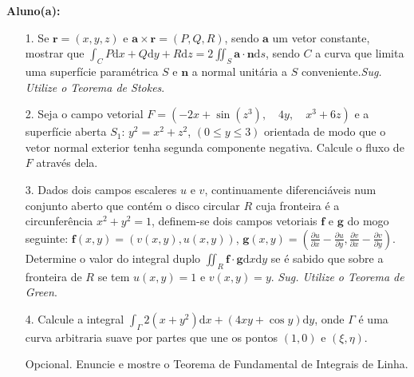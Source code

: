 \documentclass[oneside,a4paper,12pt]{article}
\begin{document}
     \begin{flushleft}
     	\textbf{Aluno(a):}
     \end{flushleft}
 
 \begin{itemize}
 	\item[1.] Se $\textbf{r}=(x,y,z)$ e $\textbf{a}\times \textbf{r}=(P,Q,R)$, sendo $\textbf{a}$ um vetor constante, mostrar que $\int_{C} P\mathrm{d}x+Q\mathrm{d}y+R\mathrm{d}z=2\iint_{S}\textbf{a}\cdot \textbf{n}\mathrm{d}s$, sendo $C$ a curva que limita uma superfície paramétrica $S$ e $\textbf{n}$ a normal unitária a $S$ conveniente.\textit{Sug. Utilize o Teorema de Stokes}.
 \end{itemize} 
 \begin{itemize}
 	\item[2.] Seja o campo vetorial $F=(-2x+\sin(z^{3}),\quad 4y,\quad x^{3}+6z)$ e a superfície aberta $S_{1}$: $y^{2}=x^{2}+z^{2}$, $(0\leq y \leq 3)$ orientada de modo que o vetor normal exterior tenha segunda componente negativa. Calcule o fluxo de $F$ através dela. 
 \end{itemize}
 \begin{itemize}
 	\item [3.] Dados dois campos escaleres $u$ e $v$, continuamente diferenciáveis num conjunto aberto que contém o disco circular $R$ cuja fronteira é a circunferência $x^{2}+y^{2}=1$, definem-se dois campos vetoriais $\textbf{f}$ e $\textbf{g}$ do mogo seguinte: $\textbf{f}(x,y)=(v(x,y), u(x,y))$, $\textbf{g}(x,y)=(\frac{\partial u}{\partial x}-\frac{\partial u}{\partial y}, \frac{\partial v}{\partial x}-\frac{\partial v}{\partial y})$. Determine o valor do integral duplo $\iint_{R} \textbf{f}\cdot\textbf{g}\mathrm{d}x\mathrm{d}y$ se é sabido que sobre a fronteira de $R$ se tem $u(x,y)=1$ e $v(x,y)=y$. \textit{Sug. Utilize o Teorema de Green}.
 \end{itemize}
 \begin{itemize}
 	\item[4.]Calcule a integral $\int_{\Gamma}2(x+y^{2}) \mathrm{d}x+(4xy+\cos y)\mathrm{d}y$, onde $\Gamma$ é uma curva arbitraria suave por partes que une os pontos $(1,0)$ e $(\xi, \eta)$.
 \end{itemize}
 \begin{itemize}
 	\item[Opcional.] Enuncie e mostre o Teorema de Fundamental de Integrais de Linha.
 \end{itemize}
\flushbottom
\flushright
\end{document}

